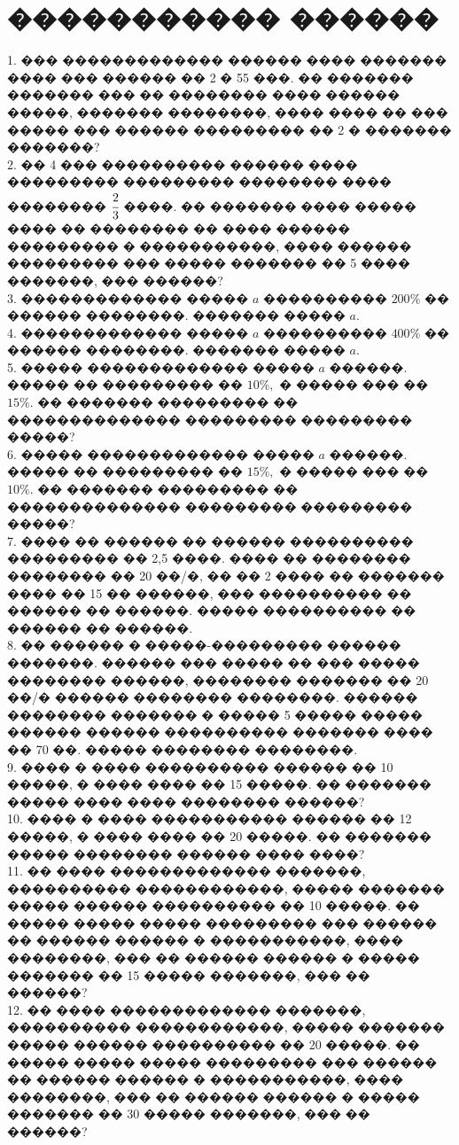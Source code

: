 \documentclass[12pt]{article}
\begin{document}
\section{����������� ������}
1. ��� ������������� ������ ���� ������� ���� ��� ������ �� 2 � 55 ���. �� ������� ������� ��� �� �������� ���� ������ �����, ������� ��������, ���� ���� �� ��� ����� ��� ������ ��������� �� 2 � ������� �������?\\
2. �� 4 ��� ���������� ������ ���� ��������� ��������� �������� ���� �������� $\cfrac{2}{3}$ ����. �� ������� ���� ����� ���� �� �������� �� ���� ������ ��������� � �����������, ���� ������ ��������� ��� ����� ������� �� 5 ���� �������, ��� ������?\\
3. ������������� ����� $a$ ���������� $200\%$ �� ������ ��������. ������� ����� $a.$\\
4. ������������� ����� $a$ ���������� $400\%$ �� ������ ��������. ������� ����� $a.$\\
5. ����� ������������� ����� $a$ ������. ����� �� ��������� �� $10\%,$ � ����� ��� �� $15\%.$ �� ������� ��������� �� �������������� ��������� ��������� �����?\\
6. ����� ������������� ����� $a$ ������. ����� �� ��������� �� $15\%,$ � ����� ��� �� $10\%.$ �� ������� ��������� �� �������������� ��������� ��������� �����?\\
7. ���� �� ������ �� ������ ���������� ��������� �� 2,5 ����. ���� �� �������� �������� �� 20 ��/�, �� �� 2 ���� �� ������� ���� �� 15 �� ������, ��� ���������� �� ������ �� ������. ����� ���������� �� ������ �� ������.\\
8. �� ������ � �����-��������� ������ �������. ������ ��� ����� �� ��� �����
�������� ������, �������� ������� �� 20 ��/� ������ �������� ��������. ������ �������� ������� � ����� 5 ����� ����� ������ ������ ���������� ������� ���� �� 70 ��. ����� �������� ��������.\\
9. ���� � ���� ���������� ������ �� 10 �����, � ���� ���� �� 15 �����. �� ������� ����� ���� ���� �������� ������?\\
10. ���� � ���� ����������� ������ �� 12 �����, � ���� ���� �� 20 �����. �� ������� ����� �������� ������ ���� ����?\\
11. �� ���� ������������� �������, ���������� ������������, ����� ������� ����� ������ ���������� �� 10 �����. �� ����� ����� ����� ��������� ��� ������ �� ������ ������ � �����������, ���� ��������, ��� �� ������ ������ � ����� ������� �� 15 ����� �������, ��� �� ������?\\
12. �� ���� ������������� �������, ���������� ������������, ����� ������� ����� ������ ���������� �� 20 �����. �� ����� ����� ����� ��������� ��� ������ �� ������ ������ � �����������, ���� ��������, ��� �� ������ ������ � ����� ������� �� 30 ����� �������, ��� �� ������?\\
\end{document}
